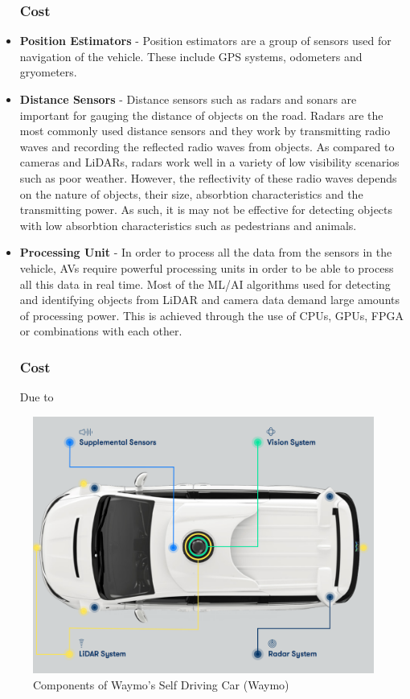 \begin{itemize}
	\subsubsection{Cost}
	
	
	\item \textbf{Position Estimators} - Position estimators are a group of sensors used for navigation of the vehicle. These include GPS systems, odometers and gryometers. 
	\item \textbf{Distance Sensors} - Distance sensors such as radars and sonars are important for gauging the distance of objects on the road. 
	Radars are the most commonly used distance sensors and they work by transmitting radio waves and recording the reflected radio waves from objects. As compared to cameras and LiDARs, radars work well in a variety of low visibility scenarios such as poor weather. 
	However, the reflectivity of these radio waves depends on the nature of objects, their size, absorbtion characteristics and the transmitting power. As such, it is may not be effective for detecting objects with low absorbtion characteristics such as pedestrians and animals.
	
	\item \textbf{Processing Unit} - In order to process all the data from the sensors in the vehicle, AVs require powerful processing units in order to be able to process all this data in real time. Most of the ML/AI algorithms used for detecting and identifying objects from LiDAR and camera data demand large amounts of processing power. This is achieved through the use of CPUs, GPUs, FPGA or combinations with each other. 
	\subsubsection{Cost}
	Due to 
	
	
\end{itemize}


\begin{figure}[h]
	\centering
	\includegraphics[width=\textwidth]{media/waymo.png}
	\caption{Components of Waymo's Self Driving Car (Waymo)}
	\label{fig:my_label}
\end{figure}

